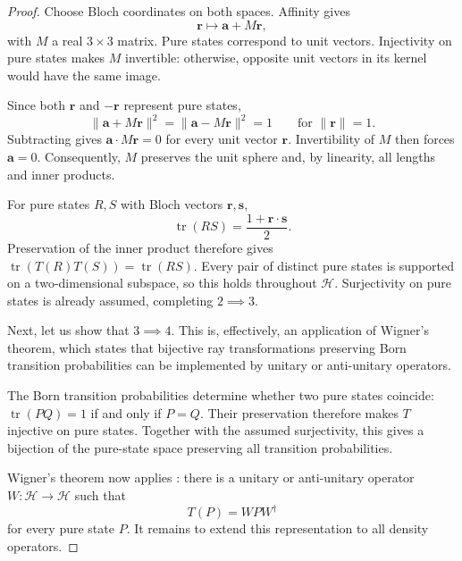 \documentclass[entropy,article,submit,moreauthors]{Definitions/mdpi}
\DeclareMathOperator{\tr}{tr}
\begin{document}
\begin{proof}
	Choose Bloch coordinates on both spaces. Affinity gives
	\begin{equation}
	\mathbf{r}\longmapsto\mathbf{a}+M\mathbf{r},
	\end{equation}
	with $M$ a real $3\times3$ matrix. Pure states correspond to unit vectors. Injectivity on pure states makes $M$ invertible: otherwise, opposite unit vectors in its kernel would have the same image.

	Since both $\mathbf{r}$ and $-\mathbf{r}$ represent pure states,
	\begin{equation}
	\|\mathbf{a}+M\mathbf{r}\|^2
	=\|\mathbf{a}-M\mathbf{r}\|^2=1
	\qquad\text{for }\|\mathbf{r}\|=1.
	\end{equation}
	Subtracting gives $\mathbf{a}\cdot M\mathbf{r}=0$ for every unit vector $\mathbf{r}$. Invertibility of $M$ then forces $\mathbf{a}=0$. Consequently, $M$ preserves the unit sphere and, by linearity, all lengths and inner products.

	For pure states $R,S$ with Bloch vectors $\mathbf{r},\mathbf{s}$,
	\begin{equation}
	\tr(RS)=\frac{1+\mathbf{r}\cdot\mathbf{s}}{2}.
	\end{equation}
	Preservation of the inner product therefore gives $\tr(T(R)T(S))=\tr(RS)$. Every pair of distinct pure states is supported on a two-dimensional subspace, so this holds throughout $\mathcal{H}$. Surjectivity on pure states is already assumed, completing $2\implies3$.
	
	Next, let us show that $3\implies4$. This is, effectively, an application of Wigner's theorem, which states that bijective ray transformations preserving Born transition probabilities can be implemented by unitary or anti-unitary operators.
	
	The Born transition probabilities determine whether two pure states coincide: $\tr(PQ)=1$ if and only if $P=Q$. Their preservation therefore makes $T$ injective on pure states. Together with the assumed surjectivity, this gives a bijection of the pure-state space preserving all transition probabilities.
	
	Wigner's theorem now applies
	\cite[Theorem~5.29]{Landsman2017}: there is a unitary or anti-unitary operator $W:\mathcal{H}\to\mathcal{H}$ such that
	\begin{equation}
		T(P)=WPW^\dagger
	\end{equation}
	for every pure state $P$. It remains to extend this representation to all density operators.
	

\end{proof}
\end{document}
